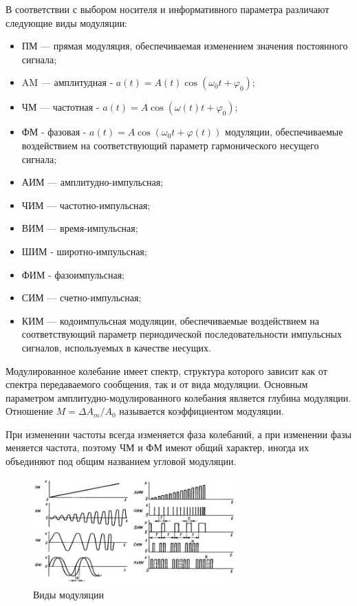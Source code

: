 \documentclass[unicode, 12pt, a4paper, oneside]{article}
\begin{document}
В соответствии с выбором носителя и информативного параметра различают следующие виды модуляции:
\begin{itemize}
\item ПМ — прямая модуляция, обеспечиваемая изменением значения постоянного сигнала; 
\item AM — амплитудная - $a(t)=A(t)\cos(\omega_0t+\varphi_0)$;
\item ЧМ — частотная - $a(t)=A\cos(\omega(t)t+\varphi_0)$;  
\item ФМ - фазовая - $a(t)=A\cos(\omega_0t+\varphi(t))$ модуляции, обеспечиваемые воздействием на соответствующий параметр гармонического несущего сигнала; 
\item АИМ — амплитудно-импульсная;
\item ЧИМ — частотно-импульсная;
\item ВИМ — время-импульсная;
\item ШИМ - широтно-импульсная;
\item ФИМ - фазоимпульсная;
\item СИМ — счетно-импульсная;
\item КИМ — кодоимпульсная модуляции, обеспечиваемые воздействием на соответствующий параметр периодической последовательности импульсных сигналов, используемых в качестве несущих.
\end{itemize}

Модулированное колебание имеет спектр, структура которого зависит как от спектра передаваемого сообщения, так и от вида модуляции. Основным параметром амплитудно-модулированного колебания является глубина модуляции. Отношение $M=\Delta A_m/A_0$ называется коэффициентом модуляции.

При изменении частоты всегда изменяется фаза колебаний, а при изменении фазы меняется частота, поэтому ЧМ и ФМ имеют общий характер, иногда их объединяют под общим названием угловой модуляции.

\begin{figure}[H]
\centering
\includegraphics[width=0.7\textwidth]{52.jpg}
\caption{Виды модуляции}
\end{figure}
\end{document}
